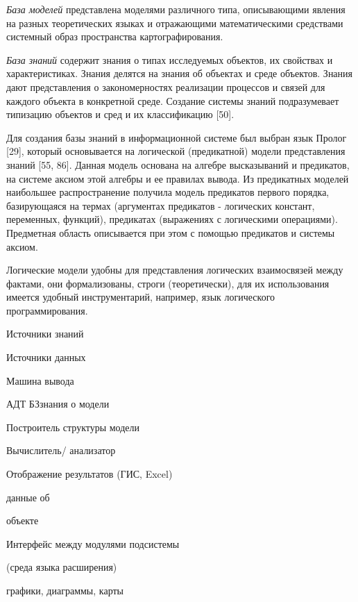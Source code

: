 \documentclass{article}
\begin{document}
\textit{База моделей }представлена моделями различного 
типа, описывающими явления на разных теоретических 
языках и отражающими математическими средствами 
системный образ пространства картографирования. 

\textit{База знаний} содержит знания о типах исследуемых 
объектов, их свойствах и характеристиках. Знания 
делятся на знания об объектах и среде объектов. 
Знания дают представления о закономерностях 
реализации процессов и связей для каждого объекта 
в конкретной среде. Создание системы знаний 
подразумевает типизацию объектов и сред и их 
классификацию [50].

Для создания базы знаний в информационной системе 
был выбран язык Пролог [29], который основывается 
на логической (предикатной) модели представления 
знаний [55, 86]. Данная модель основана на алгебре 
высказываний и предикатов, на системе аксиом 
этой алгебры и ее правилах вывода. Из предикатных 
моделей наибольшее распространение получила 
модель предикатов первого порядка, базирующаяся 
на термах (аргументах предикатов - логических 
констант, переменных, функций), предикатах (выражениях 
с логическими операциями). Предметная область 
описывается при этом с помощью предикатов и 
системы аксиом.

Логические модели удобны для представления 
логических взаимосвязей между фактами, они 
формализованы, строги (теоретически), для их 
использования имеется удобный инструментарий, 
например, язык логического программирования.

Источники знаний

Источники данных

\begin{flushright}
Машина вывода
\end{flushright}

\begin{center}
АДТ
БЗзнания о модели
\end{center}

Построитель структуры модели

Вычислитель/ анализатор

Отображение результатов (ГИС, Excel)

\begin{center}
данные об

объекте\end{center}

Интерфейс между модулями подсистемы 

(среда языка расширения)

\begin{center}
графики, диаграммы, карты
\end{center}
\end{document}
